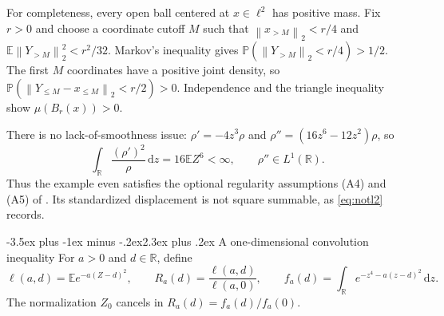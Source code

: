 \documentclass[11pt]{article}
\makeatletter
\renewcommand{\section}{\@startsection{section}{1}{0pt}
  {-3.5ex plus -1ex minus -.2ex}{2.3ex plus .2ex}
  {\normalfont\large\bfseries\color{MidnightBlue}}}
\theoremstyle{remark}
\newcommand{\E}{\mathbb E}
\newcommand{\R}{\mathbb R}
\newcommand{\dd}{\,\mathrm d}
\newcommand{\norm}[1]{\left\lVert #1\right\rVert}
\makeatother
\begin{document}
For completeness, every open ball centered at $x\in\ell^2$ has positive mass. Fix $r>0$ and choose a coordinate cutoff $M$ such that
$\norm{x_{>M}}_2<r/4$ and
$\E\norm{Y_{>M}}_2^2<r^2/32$.
Markov's inequality gives
$\mathbb P(\norm{Y_{>M}}_2<r/4)>1/2$.
The first $M$ coordinates have a positive joint density, so
$\mathbb P(\norm{Y_{\le M}-x_{\le M}}_2<r/2)>0$.
Independence and the triangle inequality show $\mu(B_r(x))>0$.

There is no lack-of-smoothness issue: $\rho'=-4z^3\rho$ and
$\rho''=(16z^6-12z^2)\rho$, so
\[
\int_\R\frac{(\rho')^2}{\rho}\dd z=16\E Z^6<\infty,
\qquad \rho''\in L^1(\R).
\]
Thus the example even satisfies the optional regularity assumptions (A4) and (A5) of \cite{AKLS}. Its standardized displacement is not square summable, as \eqref{eq:notl2} records.

\section{A one-dimensional convolution inequality}
For $a>0$ and $d\in\R$, define
\begin{equation}\label{eq:Ra}
\ell(a,d)=\E e^{-a(Z-d)^2},\qquad
R_a(d)=\frac{\ell(a,d)}{\ell(a,0)},\qquad
f_a(d)=\int_\R e^{-z^4-a(z-d)^2}\dd z.
\end{equation}
The normalization $Z_0$ cancels in $R_a(d)=f_a(d)/f_a(0)$.
\end{document}
